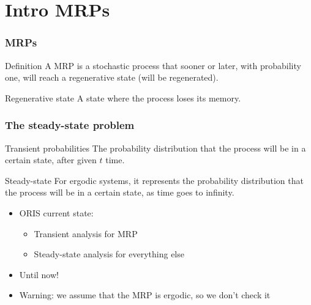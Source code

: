 \section{Intro \acfp{MRP}}
\begin{frame}
  \frametitle{\acfp{MRP}}
  \begin{block}{Definition}
    A \acf{MRP} is a stochastic process that sooner or later, with
    probability one, will
    reach a \alert{regenerative} state (will be regenerated).
  \end{block}
  \pause
  \begin{block}{Regenerative state}
    A state where the process loses its memory. 
  \end{block}
  \pause
  \begin{center}    
  \end{center}
\end{frame}

\begin{frame}
  \frametitle{The steady-state problem}
  \begin{block}{Transient probabilities}
    The probability distribution that the process will be in a certain
    state, after given $t$ time.
  \end{block}
  \pause
  \begin{block}{Steady-state}
    For ergodic systems, it represents the probability distribution
    that the
    process will be in a certain state, as time goes to infinity.
  \end{block}
  \pause
  \begin{itemize}
  \item ORIS current state:
    \begin{itemize}
    \item Transient analysis for \acf{MRP}
    \item Steady-state analysis for everything else
    \end{itemize}
    \pause
  \item Until now! 
    \pause
  \item \alert{Warning:} we assume that the \acs{MRP} is ergodic, so we don't check it
  \end{itemize}
\end{frame}

